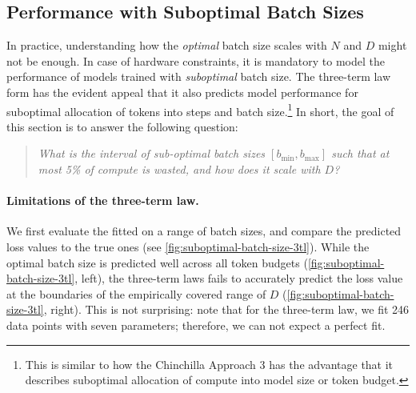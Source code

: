 \documentclass[12pt,a4paper,twoside]{article}
\begin{document}
\subsection{Performance with Suboptimal Batch Sizes}\label{sec:suboptimal-regime}

In practice, understanding how the \emph{optimal} batch size scales with $N$ and $D$ might not be enough. In case of hardware constraints, it is mandatory to model the performance of models trained with \emph{suboptimal} batch size. 
The three-term law form has the evident appeal that it also predicts model performance for suboptimal allocation of tokens into steps and batch size.\footnote{This is similar to how the Chinchilla Approach 3 has the advantage that it describes suboptimal allocation of compute into model size or token budget.} In short, the goal of this section is to answer the following question:
\begin{quote}
    \textit{What is the interval of sub-optimal batch sizes $[b_{\min}, b_{\max}]$ such that at most 5\% of compute is wasted, and how does it scale with $D$?}
\end{quote}

\paragraph{Limitations of the three-term law.} We first evaluate the fitted \tttl{} on a range of batch sizes, and compare the predicted loss values to the true ones (see \cref{fig:suboptimal-batch-size-3tl}). While the optimal batch size is predicted well across all token budgets (\cref{fig:suboptimal-batch-size-3tl}, left), the three-term laws fails to accurately predict the loss value at the boundaries of the empirically covered range of $D$ (\cref{fig:suboptimal-batch-size-3tl}, right). 
This is not surprising: note that for the three-term law, we fit 246 data points with seven parameters; therefore, we can not expect a perfect fit.

\end{document}
